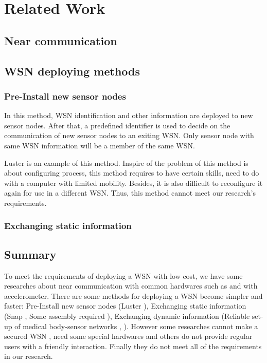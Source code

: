 \chapter{Related Work}\label{chap:related}

\clearpage

\section{Near communication}\label{sec:related_near}


\section{WSN deploying methods}\label{sec:related_setting}

\subsection{Pre-Install new sensor nodes}

In this method, WSN identification and other information are deployed to new sensor nodes. After that, a predefined identifier is used to decide on the communication of new sensor nodes to an exiting WSN. Only sensor node with same WSN information will be a member of the same WSN. 

Luster \cite{Selavo:2007:LWS:1322263.1322274} is an example of this method. Inspire of the problem of this method is about configuring process, this method requires to have certain skills, need to do with a computer with limited mobility. Besides, it is also difficult to reconfigure it again for use in a different WSN. Thus, this method cannot meet our research's requirements.

\subsection{Exchanging static information}

\section{Summary}
To meet the requirements of deploying a WSN with low cost, we have some researches about near communication with common hardwares such as \cite{Mayrhofer:2007:SWB:1758156.1758168} and  \cite{vibconnect} with accelerometer. There are some methods for deploying a WSN become simpler and faster: Pre-Install new sensor nodes (Luster \cite{Selavo:2007:LWS:1322263.1322274}), Exchanging static information (Snap \cite{Duquennoy:2011:DSR:2070942.2071012}, Some assembly required  \cite{someassemblyrequired}), Exchanging dynamic information (Reliable set-up of medical body-sensor networks \cite{bodysensor}, \cite{Beigl:2006:UEU:1127777.1127832}). However some researches cannot make a secured WSN \cite{Duquennoy:2011:DSR:2070942.2071012}\cite{someassemblyrequired}\cite{Beigl:2006:UEU:1127777.1127832},  \cite{bodysensor} need some special hardwares and others \cite{Selavo:2007:LWS:1322263.1322274} do not provide regular users with a friendly interaction. Finally they do not meet all of the requirements in our research.%